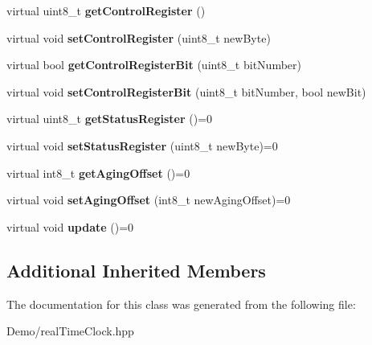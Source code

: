 \begin{DoxyCompactItemize}
\mbox{\label{classreal_time_clock_a13820319507d89a62a5b37b252ea6d0d}} 
virtual uint8\+\_\+t {\bfseries get\+Control\+Register} ()
\item 
\mbox{\label{classreal_time_clock_ab4034ba75fb65a55fb725c37e89f7626}} 
virtual void {\bfseries set\+Control\+Register} (uint8\+\_\+t new\+Byte)
\item 
\mbox{\label{classreal_time_clock_a762441ffb1fbee666cd1642edfb8c929}} 
virtual bool {\bfseries get\+Control\+Register\+Bit} (uint8\+\_\+t bit\+Number)
\item 
\mbox{\label{classreal_time_clock_af9b7db85f78d01060772bdb3b397ea3c}} 
virtual void {\bfseries set\+Control\+Register\+Bit} (uint8\+\_\+t bit\+Number, bool new\+Bit)
\item 
\mbox{\label{classreal_time_clock_a38dcc51b0b30a5e480ea7f18f2c792ba}} 
virtual uint8\+\_\+t {\bfseries get\+Status\+Register} ()=0
\item 
\mbox{\label{classreal_time_clock_aa8ee80a7056c67543834508d0f04a218}} 
virtual void {\bfseries set\+Status\+Register} (uint8\+\_\+t new\+Byte)=0
\item 
\mbox{\label{classreal_time_clock_a2bc081385a6ad8273201d66217f8b2f0}} 
virtual int8\+\_\+t {\bfseries get\+Aging\+Offset} ()=0
\item 
\mbox{\label{classreal_time_clock_aacf97da86677ee3fb55b5180ba5c0727}} 
virtual void {\bfseries set\+Aging\+Offset} (int8\+\_\+t new\+Aging\+Offset)=0
\item 
\mbox{\label{classreal_time_clock_afb5132ca3cbe80552a88041cead0a2b3}} 
virtual void {\bfseries update} ()=0
\end{DoxyCompactItemize}
\subsection*{Additional Inherited Members}


The documentation for this class was generated from the following file\+:\begin{DoxyCompactItemize}
\item 
Demo/real\+Time\+Clock.\+hpp\end{DoxyCompactItemize}
